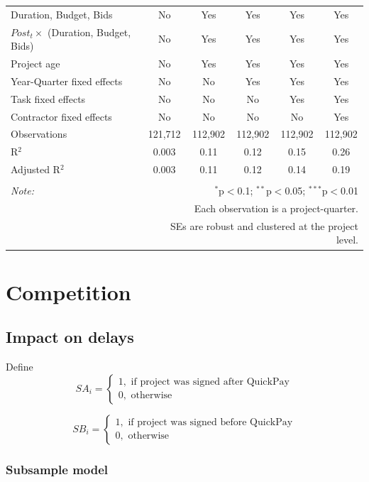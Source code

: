 \documentclass[
]{article}
\begin{document}
\begin{table}[H]
\begin{tabular}{@{\extracolsep{-2pt}}lccccc}
Duration, Budget, Bids & No & Yes & Yes & Yes & Yes \\ 
$Post_t \times $  (Duration, Budget, Bids) & No & Yes & Yes & Yes & Yes \\ 
Project age & No & Yes & Yes & Yes & Yes \\ 
Year-Quarter fixed effects & No & No & Yes & Yes & Yes \\ 
Task fixed effects & No & No & No & Yes & Yes \\ 
Contractor fixed effects & No & No & No & No & Yes \\ 
Observations & 121,712 & 112,902 & 112,902 & 112,902 & 112,902 \\ 
R$^{2}$ & 0.003 & 0.11 & 0.12 & 0.15 & 0.26 \\ 
Adjusted R$^{2}$ & 0.003 & 0.11 & 0.12 & 0.14 & 0.19 \\ 
\hline 
\hline \\[-1.8ex] 
\textit{Note:}  & \multicolumn{5}{r}{$^{*}$p$<$0.1; $^{**}$p$<$0.05; $^{***}$p$<$0.01} \\ 
 & \multicolumn{5}{r}{Each observation is a project-quarter.} \\ 
 & \multicolumn{5}{r}{SEs are robust and clustered at the project level.} \\ 
\end{tabular} 
\end{table}

\hypertarget{competition}{%
\section{Competition}\label{competition}}

\hypertarget{impact-on-delays}{%
\subsection{Impact on delays}\label{impact-on-delays}}

Define
\[ SA_i = \begin{cases} 1, \text{ if project was signed after QuickPay}\\
0, \text{ otherwise} \end{cases}\]

\[ SB_i = \begin{cases} 1, \text{ if project was signed before QuickPay}\\
0, \text{ otherwise} \end{cases}\]

\hypertarget{subsample-model}{%
\subsubsection{Subsample model}\label{subsample-model}}
\end{document}
